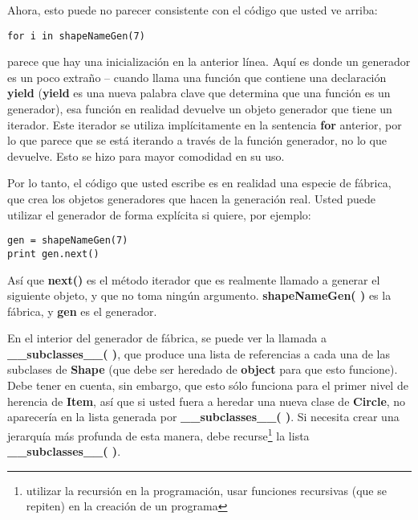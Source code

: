 Ahora, esto puede no parecer consistente con el código que usted ve arriba:     \newline

\begin{lstlisting} 
for i in shapeNameGen(7)
\end{lstlisting}

parece que hay una inicialización en la anterior línea. Aquí es donde un generador es un poco extraño – cuando llama una función que contiene una declaración \textbf{yield} (\textbf{yield} es una nueva palabra clave que determina que una función es un generador), esa función en realidad devuelve un objeto generador que tiene un iterador. Este iterador se utiliza implícitamente en la sentencia \textbf{for} anterior, por lo que parece que se está iterando a través de la función generador, no lo que devuelve. Esto se hizo para mayor comodidad en su uso.    \newline

Por lo tanto, el código que usted escribe es en realidad una especie de fábrica, que crea los objetos generadores que hacen la generación real. Usted puede utilizar el generador de forma explícita si quiere, por ejemplo:    \newline

\begin{lstlisting} 
gen = shapeNameGen(7) 
print gen.next() 
\end{lstlisting}

Así que \textbf{next()} es el método iterador que es realmente llamado a generar el siguiente objeto, y que no toma ningún argumento. \textbf{shapeNameGen( )} es la fábrica, y \textbf{gen} es el generador.     \newline

En el interior del generador de fábrica, se puede ver la llamada a \textbf{\_\_subclasses\_\_( )}, que produce una lista de referencias a cada una de las subclases de \textbf{Shape} (que debe ser heredado de \textbf{object} para que esto funcione). Debe tener en cuenta, sin embargo, que esto sólo funciona para el primer nivel de herencia de \textbf{Item}, así que si usted fuera a heredar una nueva clase de \textbf{Circle}, no aparecería en la lista generada por \textbf{\_\_subclasses\_\_( )}. Si necesita crear una jerarquía más profunda de esta manera, debe recurse\footnote{utilizar la recursión en la programación, usar funciones recursivas (que se repiten) en la creación de un programa} la lista \textbf{\_\_subclasses\_\_( )}.   \newline

